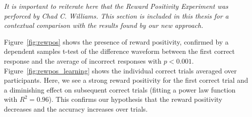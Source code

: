 \emph{It is important to reiterate here that the Reward Positivity Experiment 
was perforced by Chad C. Williams. This section is included in this thesis for 
a contextual comparison with the results found by our new approach.}

Figure~\ref{fig:rewpos} shows the presence of reward positivity, confirmed by a 
dependent samples t-test of the difference waveform between the first correct 
response and the average of incorrect responses with $p < 0.001$.  
Figure~\ref{fig:rewpos_learning} shows the individual correct trials averaged 
over participants. Here, we see a strong reward positivity for the first 
correct trial and a diminishing effect on subsequent correct trials (fitting a 
power law function with $R^2 = 0.96$). This confirms our hypothesis that the 
reward positivity decreases and the \tvt accuracy increases over trials.
